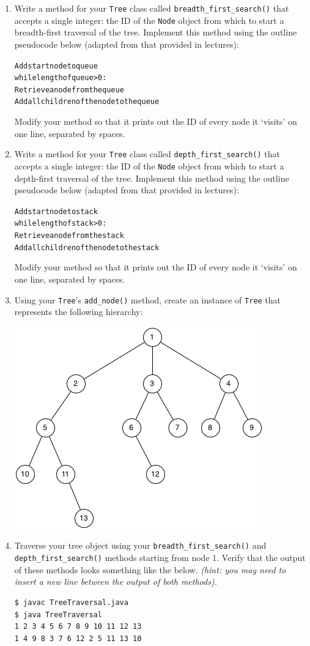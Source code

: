 \documentclass[11pt,a4paper]{report}
\begin{document}
\begin{enumerate}
\item Write a method for your \texttt{Tree} class called \texttt{breadth\_first\_search()} that accepts a single integer: the ID of the \texttt{Node} object from which to start a breadth-first traversal of the tree. Implement this method using the outline pseudocode below (adapted from that provided in lectures):
\begin{alltt}
Add start node to queue
while length of queue > 0:
    Retrieve a node from the queue
    Add all children of the node to the queue
\end{alltt}
    Modify your method so that it prints out the ID of every node it `visits' on one line, separated by spaces.

\item Write a method for your \texttt{Tree} class called \texttt{depth\_first\_search()} that accepts a single integer: the ID of the \texttt{Node} object from which to start a depth-first traversal of the tree. Implement this method using the outline pseudocode below (adapted from that provided in lectures):
\begin{alltt}
Add start node to stack
while length of stack > 0:
    Retrieve a node from the stack
    Add all children of the node to the stack
\end{alltt}
    Modify your method so that it prints out the ID of every node it `visits' on one line, separated by spaces. 

\item Using your \texttt{Tree}'s \texttt{add\_node()} method, create an instance of \texttt{Tree} that represents the following hierarchy:
    \begin{center}
        \includegraphics[width=.6\textwidth]{media/tree.png}
    \end{center}

\item Traverse your tree object using your \texttt{breadth\_first\_search()} and \texttt{depth\_first\_search()} methods starting from node 1. Verify that the output of these methods looks something like the below. \textit{(hint: you may need to insert a new line between the output of both methods).}
\begin{verbatim}
$ javac TreeTraversal.java
$ java TreeTraversal
1 2 3 4 5 6 7 8 9 10 11 12 13
1 4 9 8 3 7 6 12 2 5 11 13 10
\end{verbatim}


\end{enumerate}
\end{document}
